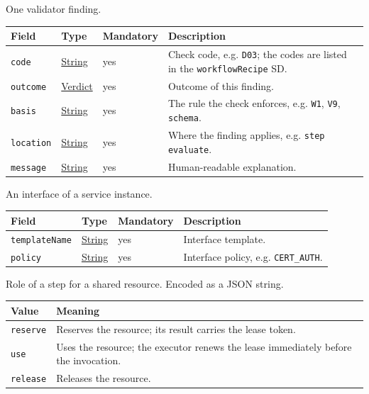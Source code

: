 \documentclass[a4paper]{arrowhead}
\newcommand{\mref}[1]{{\textcolor{ArrowheadPurple}{\hyperref[sec:model:#1]{#1}}}}
\newcommand{\pref}[1]{{\textcolor{ArrowheadGrey}{\hyperref[sec:model:primitives:#1]{#1}}}}
\begin{document}
One validator finding.

{\small
\begin{longtable}{|p{3.7cm}|p{4.2cm}|p{1.6cm}|p{6.3cm}|}

\hline
\rowcolor{gray!33} Field & Type & Mandatory & Description \\ \hline
\endhead
\texttt{code} & \pref{String} & yes & Check code, e.g. \texttt{D03}; the codes are listed in the \texttt{workflowRecipe} SD. \\ \hline
\texttt{outcome} & \mref{Verdict} & yes & Outcome of this finding. \\ \hline
\texttt{basis} & \pref{String} & yes & The rule the check enforces, e.g. \texttt{W1}, \texttt{V9}, \texttt{schema}. \\ \hline
\texttt{location} & \pref{String} & yes & Where the finding applies, e.g. \texttt{step evaluate}. \\ \hline
\texttt{message} & \pref{String} & yes & Human-readable explanation. \\ \hline
\end{longtable}
}

An interface of a service instance.

{\small
\begin{longtable}{|p{3.7cm}|p{4.2cm}|p{1.6cm}|p{6.3cm}|}

\hline
\rowcolor{gray!33} Field & Type & Mandatory & Description \\ \hline
\endhead
\texttt{templateName} & \pref{String} & yes & Interface template. \\ \hline
\texttt{policy} & \pref{String} & yes & Interface policy, e.g. \texttt{CERT\_AUTH}. \\ \hline
\end{longtable}
}

Role of a step for a shared resource.
 Encoded as a JSON string.
{\small
\begin{longtable}{|p{3.9cm}|p{11.9cm}|}

\hline
\rowcolor{gray!33} Value & Meaning \\ \hline
\endhead
\texttt{reserve} & Reserves the resource; its result carries the lease token. \\ \hline
\texttt{use} & Uses the resource; the executor renews the lease immediately before the invocation. \\ \hline
\texttt{release} & Releases the resource. \\ \hline
\end{longtable}
}
\end{document}
